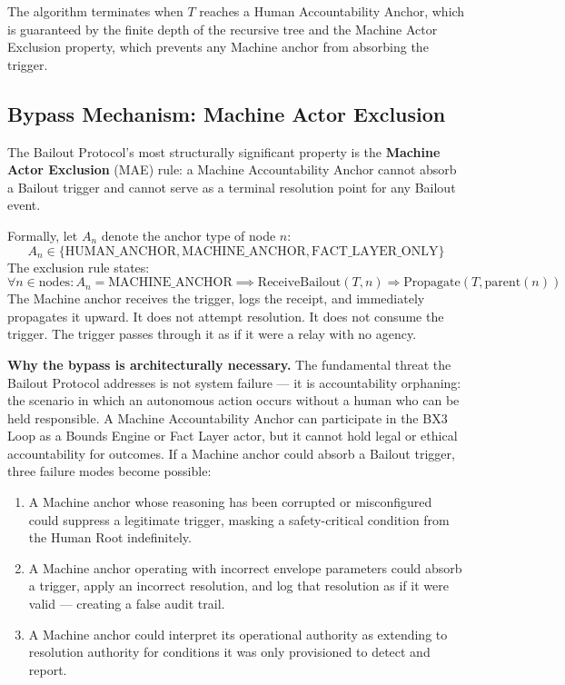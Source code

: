\bigskip
The algorithm terminates when $T$ reaches a Human Accountability Anchor, which is guaranteed by the finite depth of the recursive tree and the Machine Actor Exclusion property, which prevents any Machine anchor from absorbing the trigger.

\subsection{Bypass Mechanism: Machine Actor Exclusion}

The Bailout Protocol's most structurally significant property is the \textbf{Machine Actor Exclusion} (MAE) rule: a Machine Accountability Anchor cannot absorb a Bailout trigger and cannot serve as a terminal resolution point for any Bailout event.

Formally, let $A_n$ denote the anchor type of node $n$:
\begin{equation}
A_n \in \{\text{HUMAN\_ANCHOR}, \text{MACHINE\_ANCHOR}, \text{FACT\_LAYER\_ONLY}\}
\end{equation}
The exclusion rule states:
\begin{equation}
\forall n \in \text{nodes}: A_n = \text{MACHINE\_ANCHOR} \implies \text{ReceiveBailout}(T, n) \Rightarrow \text{Propagate}(T, \text{parent}(n))
\end{equation}
The Machine anchor receives the trigger, logs the receipt, and immediately propagates it upward. It does not attempt resolution. It does not consume the trigger. The trigger passes through it as if it were a relay with no agency.

\bigskip
\noindent\textbf{Why the bypass is architecturally necessary.} The fundamental threat the Bailout Protocol addresses is not system failure — it is accountability orphaning: the scenario in which an autonomous action occurs without a human who can be held responsible. A Machine Accountability Anchor can participate in the BX3 Loop as a Bounds Engine or Fact Layer actor, but it cannot hold legal or ethical accountability for outcomes. If a Machine anchor could absorb a Bailout trigger, three failure modes become possible:

\begin{enumerate}
    \item[\textbf{Compromised Bounds Engine:}] A Machine anchor whose reasoning has been corrupted or misconfigured could suppress a legitimate trigger, masking a safety-critical condition from the Human Root indefinitely.
    \item[\textbf{Misconfigured Safety Envelope:}] A Machine anchor operating with incorrect envelope parameters could absorb a trigger, apply an incorrect resolution, and log that resolution as if it were valid — creating a false audit trail.
    \item[\textbf{Delegation Authority Confusion:}] A Machine anchor could interpret its operational authority as extending to resolution authority for conditions it was only provisioned to detect and report.
\end{enumerate}

